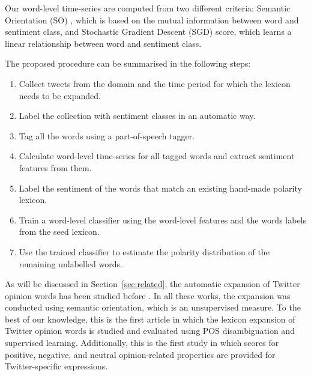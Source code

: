 \documentclass{sig-alternate}
\begin{document}


Our word-level time-series are computed from two different criteria: Semantic Orientation (SO) \cite{Turney2002}, which is based on the mutual information between word and sentiment class, and Stochastic Gradient Descent (SGD) score, which learns a linear relationship between word and sentiment class.

The proposed procedure can be summarised in the following steps:

\begin{enumerate}
\item Collect tweets from the domain and the time period for which the lexicon needs to be expanded. 
\item Label the collection with sentiment classes in an automatic way.
\item Tag all the words using a part-of-speech tagger.
\item Calculate word-level time-series for all tagged words and extract sentiment features from them.
\item Label the sentiment of the words that match an existing hand-made polarity lexicon.
\item Train a word-level classifier using the word-level features and the words labels from the seed lexicon.
\item Use the trained classifier to estimate the polarity distribution of the remaining unlabelled words.
\end{enumerate}
 
As will be discussed in Section~\ref{sec:related}, the automatic expansion of Twitter  opinion words has been studied before \cite{avaya2013,Mohammad2013,Zhou2014}. In all these works, the expansion was conducted using semantic orientation, which is an unsupervised measure.  
To the best of our knowledge, this is the first article in which the lexicon expansion of Twitter opinion words is studied and evaluated using POS disambiguation and supervised learning. Additionally, this is the first study in which scores for positive, negative, and neutral opinion-related properties are provided for Twitter-specific expressions.
\end{document}

